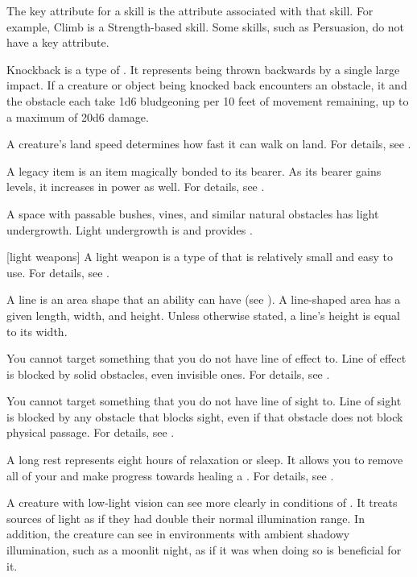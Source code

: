  The key attribute for a skill is the attribute associated with that skill.
For example, Climb is a Strength-based skill.
Some skills, such as Persuasion, do not have a key attribute.

 Knockback is a type of .
It represents being thrown backwards by a single large impact.
If a creature or object being knocked back encounters an obstacle, it and the obstacle each take 1d6 bludgeoning  per 10 feet of movement remaining, up to a maximum of 20d6 damage.

 A creature's land speed determines how fast it can walk on land.
For details, see .

 A legacy item is an item magically bonded to its bearer.
As its bearer gains levels, it increases in power as well.
For details, see .

 A space with passable bushes, vines, and similar natural obstacles has light undergrowth.
Light undergrowth is  and provides .

[light weapons] A light weapon is a type of  that is relatively small and easy to use.
For details, see .

 A line is an area shape that an ability can have (see ).
A line-shaped area has a given length, width, and height.
Unless otherwise stated, a line's height is equal to its width.

 You cannot target something that you do not have line of effect to.
Line of effect is blocked by solid obstacles, even invisible ones.
For details, see .

 You cannot target something that you do not have line of sight to.
Line of sight is blocked by any obstacle that blocks sight, even if that obstacle does not block physical passage.
For details, see .

 A long rest represents eight hours of relaxation or sleep.
It allows you to remove all of your  and make progress towards healing a .
For details, see .

 A creature with low-light vision can see more clearly in conditions of .
It treats sources of light as if they had double their normal illumination range.
In addition, the creature can see in environments with ambient shadowy illumination, such as a moonlit night, as if it was  when doing so is beneficial for it.

